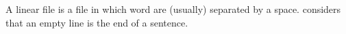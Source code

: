 \documentclass[manual-fr.tex]{subfiles}
\begin{document}
A linear file is a file in which word are (usually) separated by a space. \SEM considers that an empty line is the end of a sentence.
\end{document}
